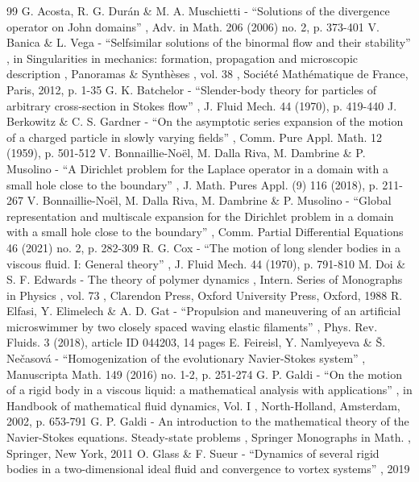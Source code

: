 \documentclass[10pt]{amsart}
\theoremstyle{definition}
\theoremstyle{remark}
\begin{document}
\begin{thebibliography}{99}
 G. Acosta, R. G. Durán \& M. A. Muschietti - “Solutions of the divergence operator on John domains” , Adv. in Math. 206 (2006) no. 2, p. 373-401
 V. Banica \& L. Vega - “Selfsimilar solutions of the binormal flow and their stability” , in Singularities in mechanics: formation, propagation and microscopic description , Panoramas \& Synthèses , vol. 38 , Société Mathématique de France, Paris, 2012, p. 1-35
 G. K. Batchelor - “Slender-body theory for particles of arbitrary cross-section in Stokes flow” , J. Fluid Mech. 44 (1970), p. 419-440
 J. Berkowitz \& C. S. Gardner - “On the asymptotic series expansion of the motion of a charged particle in slowly varying fields” , Comm. Pure Appl. Math. 12 (1959), p. 501-512
 V. Bonnaillie-Noël, M. Dalla Riva, M. Dambrine \& P. Musolino - “A Dirichlet problem for the Laplace operator in a domain with a small hole close to the boundary” , J. Math. Pures Appl. (9) 116 (2018), p. 211-267
 V. Bonnaillie-Noël, M. Dalla Riva, M. Dambrine \& P. Musolino - “Global representation and multiscale expansion for the Dirichlet problem in a domain with a small hole close to the boundary” , Comm. Partial Differential Equations 46 (2021) no. 2, p. 282-309
 R. G. Cox - “The motion of long slender bodies in a viscous fluid. I: General theory” , J. Fluid Mech. 44 (1970), p. 791-810
 M. Doi \& S. F. Edwards - The theory of polymer dynamics , Intern. Series of Monographs in Physics , vol. 73 , Clarendon Press, Oxford University Press, Oxford, 1988
 R. Elfasi, Y. Elimelech \& A. D. Gat - “Propulsion and maneuvering of an artificial microswimmer by two closely spaced waving elastic filaments” , Phys. Rev. Fluids. 3 (2018), article ID 044203, 14 pages
 E. Feireisl, Y. Namlyeyeva \& Š. Nečasová - “Homogenization of the evolutionary Navier-Stokes system” , Manuscripta Math. 149 (2016) no. 1-2, p. 251-274
 G. P. Galdi - “On the motion of a rigid body in a viscous liquid: a mathematical analysis with applications” , in Handbook of mathematical fluid dynamics, Vol. I , North-Holland, Amsterdam, 2002, p. 653-791
 G. P. Galdi - An introduction to the mathematical theory of the Navier-Stokes equations. Steady-state problems , Springer Monographs in Math. , Springer, New York, 2011
 O. Glass \& F. Sueur - “Dynamics of several rigid bodies in a two-dimensional ideal fluid and convergence to vortex systems” , 2019

\end{thebibliography}
\end{document}
